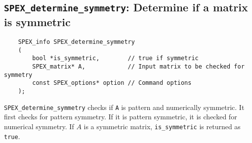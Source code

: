 \documentclass[12pt]{report}
\theoremstyle{definition}
\begin{document}
\subsection{\texttt{SPEX\_determine\_symmetry}: Determine if a matrix is symmetric}

\begin{mdframed}[userdefinedwidth=6in]
{\footnotesize
\begin{verbatim}
    SPEX_info SPEX_determine_symmetry
    (
        bool *is_symmetric,        // true if symmetric
        SPEX_matrix* A,            // Input matrix to be checked for symmetry
        const SPEX_options* option // Command options
    ); 
\end{verbatim}
} \end{mdframed}

\verb|SPEX_determine_symmetry| checks if \verb|A| is pattern and numerically symmetric. It first checks for pattern symmetry. If it is pattern symmetric, it is checked for numerical symmetry. If $A$ is a symmetric matrix, \verb|is_symmetric| is returned as \verb|true|. 



\end{document}

